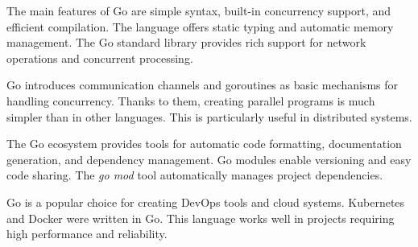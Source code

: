 The main features of Go are simple syntax, built-in concurrency support, and efficient compilation.
The language offers static typing and automatic memory management.
The Go standard library provides rich support for network operations and concurrent processing.

Go introduces communication channels and goroutines as basic mechanisms for handling concurrency.
Thanks to them, creating parallel programs is much simpler than in other languages.
This is particularly useful in distributed systems.

The Go ecosystem provides tools for automatic code formatting, documentation generation, and dependency management.
Go modules enable versioning and easy code sharing.
The \textit{go mod} tool automatically manages project dependencies.

Go is a popular choice for creating DevOps tools and cloud systems.
Kubernetes and Docker were written in Go. This language works well in projects requiring high performance and reliability.